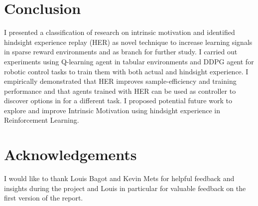 \documentclass[conference]{IEEEtran}
\begin{document}
\section{Conclusion} \label{sec:conclusion}
I presented a classification of research on intrinsic motivation and identified hindsight experience replay (HER) as novel technique to increase learning signals in sparse reward environments and as branch for further study. I carried out experiments using Q-learning agent in tabular environments and DDPG agent for robotic control tasks to train them with both actual and hindsight experience. I empirically demonstrated that HER improves sample-efficiency and training performance and that agents trained with HER can be used as controller to discover options in for a different task. I proposed potential future work to explore and improve Intrinsic Motivation using hindsight experience in Reinforcement Learning.

\section*{Acknowledgements}
I would like to thank Louis Bagot and Kevin Mets for helpful feedback and insights during the project and Louis in particular for valuable feedback on the first version of the report.

\newpage
\printbibliography
\end{document}
